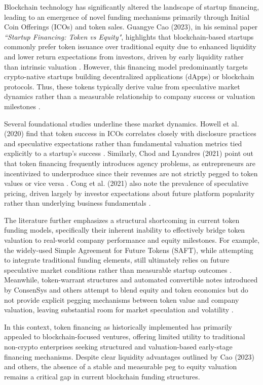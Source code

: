 \documentclass[conference]{IEEEtran}
\begin{document}
Blockchain technology has significantly altered the landscape of startup financing, leading to an emergence of novel funding mechanisms primarily through Initial Coin Offerings (ICOs) and token sales. Guangye Cao (2023), in his seminal paper \textit{``Startup Financing: Token vs Equity"}, highlights that blockchain-based startups commonly prefer token issuance over traditional equity due to enhanced liquidity and lower return expectations from investors, driven by early liquidity rather than intrinsic valuation \cite{cao2023token}. However, this financing model predominantly targets crypto-native startups building decentralized applications (dApps) or blockchain protocols. Thus, these tokens typically derive value from speculative market dynamics rather than a measurable relationship to company success or valuation milestones \cite{howell2020initial, catalini2019some}.

Several foundational studies underline these market dynamics. Howell et al. (2020) find that token success in ICOs correlates closely with disclosure practices and speculative expectations rather than fundamental valuation metrics tied explicitly to a startup’s success \cite{howell2020initial}. Similarly, Chod and Lyandres (2021) point out that token financing frequently introduces agency problems, as entrepreneurs are incentivized to underproduce since their revenues are not strictly pegged to token values or vice versa \cite{chod2021theory}. Cong et al. (2021) also note the prevalence of speculative pricing, driven largely by investor expectations about future platform popularity rather than underlying business fundamentals \cite{cong2021tokenomics}.

The literature further emphasizes a structural shortcoming in current token funding models, specifically their inherent inability to effectively bridge token valuation to real-world company performance and equity milestones. For example, the widely-used Simple Agreement for Future Tokens (SAFT), while attempting to integrate traditional funding elements, still ultimately relies on future speculative market conditions rather than measurable startup outcomes \cite{mendelson2019saft}. Meanwhile, token-warrant structures and automated convertible notes introduced by ConsenSys and others attempt to blend equity and token economics but do not provide explicit pegging mechanisms between token value and company valuation, leaving substantial room for market speculation and volatility \cite{lw2019token}.

In this context, token financing as historically implemented has primarily appealed to blockchain-focused ventures, offering limited utility to traditional non-crypto enterprises seeking structured and valuation-based early-stage financing mechanisms. Despite clear liquidity advantages outlined by Cao (2023) and others, the absence of a stable and measurable peg to equity valuation remains a critical gap in current blockchain funding structures.
\end{document}
